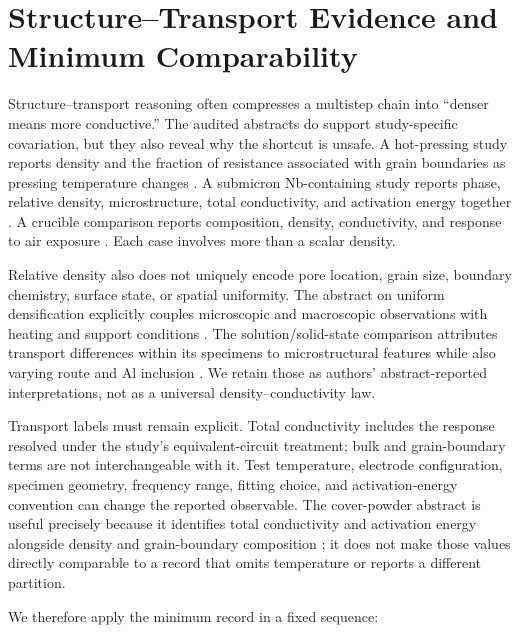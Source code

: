 \section{Structure--Transport Evidence and Minimum Comparability}

Structure--transport reasoning often compresses a multistep chain into ``denser means more conductive.'' The audited abstracts do support study-specific covariation, but they also reveal why the shortcut is unsafe. A hot-pressing study reports density and the fraction of resistance associated with grain boundaries as pressing temperature changes \cite{david2015microstructure}. A submicron Nb-containing study reports phase, relative density, microstructure, total conductivity, and activation energy together \cite{yan2020submicron}. A crucible comparison reports composition, density, conductivity, and response to air exposure \cite{xia2016ionic}. Each case involves more than a scalar density.

Relative density also does not uniquely encode pore location, grain size, boundary chemistry, surface state, or spatial uniformity. The abstract on uniform densification explicitly couples microscopic and macroscopic observations with heating and support conditions \cite{guo2023uniform}. The solution\slash solid-state comparison attributes transport differences within its specimens to microstructural features while also varying route and Al inclusion \cite{kosir2022comparative}. We retain those as authors' abstract-reported interpretations, not as a universal density--conductivity law.

Transport labels must remain explicit. Total conductivity includes the response resolved under the study's equivalent-circuit treatment; bulk and grain-boundary terms are not interchangeable with it. Test temperature, electrode configuration, specimen geometry, frequency range, fitting choice, and activation-energy convention can change the reported observable. The cover-powder abstract is useful precisely because it identifies total conductivity and activation energy alongside density and grain-boundary composition \cite{zhang2019densification}; it does not make those values directly comparable to a record that omits temperature or reports a different partition.

We therefore apply the minimum record in a fixed sequence:

